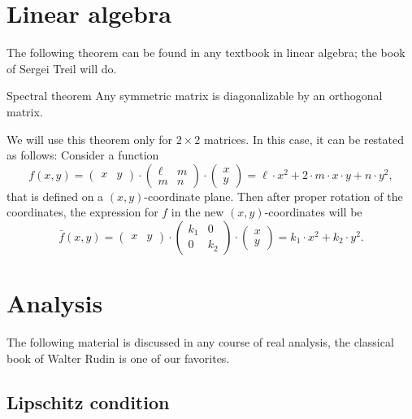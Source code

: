 \section{Linear algebra}

The following theorem can be found in any textbook in linear algebra;
the book of Sergei Treil \cite{treil} will do.

\begin{thm}{Spectral theorem}\label{thm:spectral}
Any symmetric matrix is diagonalizable  by an orthogonal matrix.
\end{thm}

We will use this theorem only for $2{\times}2$ matrices.
In this case, it can be restated as follows:
Consider a function 
\[f(x,y)=
\begin{pmatrix}
x&y
\end{pmatrix}
\cdot
\begin{pmatrix}
\ell&m
\\
m&n
\end{pmatrix}
\cdot
\begin{pmatrix}
x\\y
\end{pmatrix}
=\ell\cdot x^2+2\cdot m\cdot x\cdot y+n\cdot y^2,\]
that is defined on a $(x,y)$-coordinate plane.
Then after proper rotation of the coordinates, 
the expression for $f$ in the new $(x,y)$-coordinates will be
\[\bar f(x,y)=
\begin{pmatrix}
x&y
\end{pmatrix}
\cdot
\begin{pmatrix}
k_1&0
\\
0&k_2
\end{pmatrix}
\cdot
\begin{pmatrix}
x\\y
\end{pmatrix}
=k_1\cdot x^2+k_2\cdot y^2.\]

\section{Analysis}\label{sec:analysis}

The following material is discussed in any course of real analysis, the classical book of Walter Rudin \cite{rudin} is one of our favorites.

\subsection*{Lipschitz condition}

